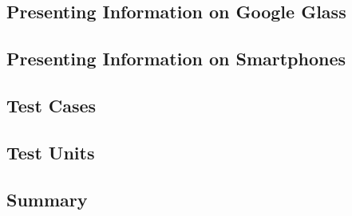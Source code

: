 

\label{subsec:application}


\subsection{Presenting Information on Google Glass}
\label{subsec:informationlimitedspace}


\subsection{Presenting Information on Smartphones}
\label{subsec:smartphones}


\subsection{Test Cases}
\label{subsec:testcases}


\subsection{Test Units}
\label{subsec:testunits}


\newpage
\subsection{Summary}
\label{subsec:summary}
